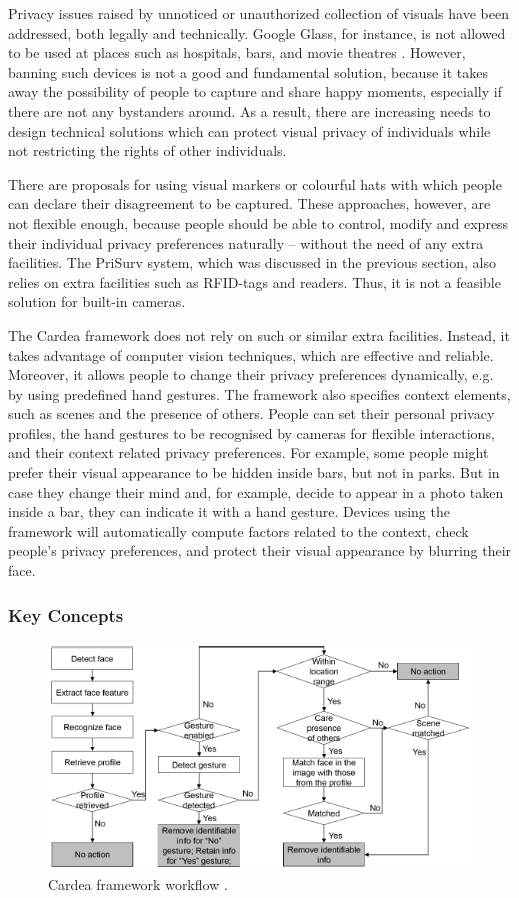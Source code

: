 \documentclass[conference]{IEEEtran}
\begin{document}
Privacy issues raised by unnoticed or unauthorized collection of visuals have been addressed, both legally and technically. Google Glass, for instance, is not allowed to be used at places such as hospitals, bars, and movie theatres \cite{google2013glass}. However, banning such devices is not a good and fundamental solution, because it takes away the possibility of people to capture and share happy moments, especially if there are not any bystanders around. As a result, there are increasing needs to design technical solutions which can protect visual privacy of individuals while not restricting the rights of other individuals. 
	
There are proposals for using visual markers \cite{roesner2014, liu2014} or colourful hats \cite{sastry2007} with which people can declare their disagreement to be captured. These approaches, however, are not flexible enough, because people should be able to control, modify and express their individual privacy preferences naturally – without the need of any extra facilities. The PriSurv system, which was discussed in the previous section, also relies on extra facilities such as \ac{RFID}-tags and readers. Thus, it is not a feasible solution for built-in cameras. 

The Cardea framework \cite{shu2016cardea} does not rely on such or similar extra facilities. Instead, it takes advantage of computer vision techniques, which are effective and reliable. Moreover, it allows people to change their privacy preferences dynamically, e.g. by using predefined hand gestures. The framework also specifies context elements, such as scenes and the presence of others. People can set their personal privacy profiles, the hand gestures to be recognised by cameras for flexible interactions, and their context related privacy preferences. For example, some people might prefer their visual appearance to be hidden inside bars, but not in parks. But in case they change their mind and, for example, decide to appear in a photo taken inside a bar, they can indicate it with a hand gesture. Devices using the framework will automatically compute factors related to the context, check people's privacy preferences, and protect their visual appearance by blurring their face.

\subsubsection{Key Concepts}
\begin{figure}[t]
\centerline{\includegraphics[width=.5\textwidth]{img/cardea_workflow.png}}
\caption{Cardea framework workflow \cite{shu2016cardea}.}
\label{fig:cardea}
\end{figure}
\end{document}
